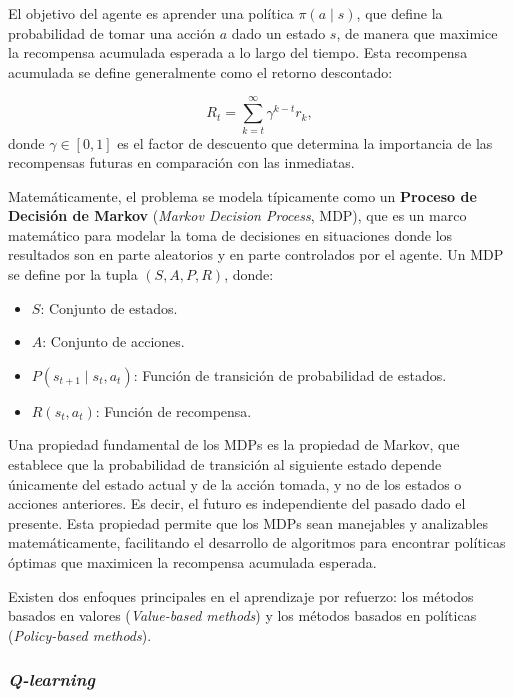 \documentclass[11pt,a4paper,spanish]{article}
\numberwithin{equation}{section} %
\begin{document}
El objetivo del agente es aprender una política $\pi(a \mid s)$, que define la probabilidad de tomar una acción $a$ dado un estado $s$, de manera que maximice la recompensa acumulada esperada a lo largo del tiempo. Esta recompensa acumulada se define generalmente como el retorno descontado:

\begin{equation}
R_t = \sum_{k=t}^{\infty} \gamma^{k-t} r_k,
\end{equation}
donde $\gamma \in [0,1]$ es el factor de descuento que determina la importancia de las recompensas futuras en comparación con las inmediatas.

Matemáticamente, el problema se modela típicamente como un \textbf{Proceso de Decisión de Markov} (\textit{Markov Decision Process}, MDP), que es un marco matemático para modelar la toma de decisiones en situaciones donde los resultados son en parte aleatorios y en parte controlados por el agente. Un MDP se define por la tupla $(S, A, P, R)$, donde:

\begin{itemize}
    \item $S$: Conjunto de estados.
    \item $A$: Conjunto de acciones.
    \item $P(s_{t+1} \mid s_t, a_t)$: Función de transición de probabilidad de estados.
    \item $R(s_t, a_t)$: Función de recompensa.
\end{itemize}

Una propiedad fundamental de los MDPs es la propiedad de Markov, que establece que la probabilidad de transición al siguiente estado depende únicamente del estado actual y de la acción tomada, y no de los estados o acciones anteriores. Es decir, el futuro es independiente del pasado dado el presente. Esta propiedad permite que los MDPs sean manejables y analizables matemáticamente, facilitando el desarrollo de algoritmos para encontrar políticas óptimas que maximicen la recompensa acumulada esperada.

Existen dos enfoques principales en el aprendizaje por refuerzo: los métodos basados en valores (\textit{Value-based methods}) y los métodos basados en políticas (\textit{Policy-based methods}).

\subsubsection{\textit{Q-learning}}
\end{document}
